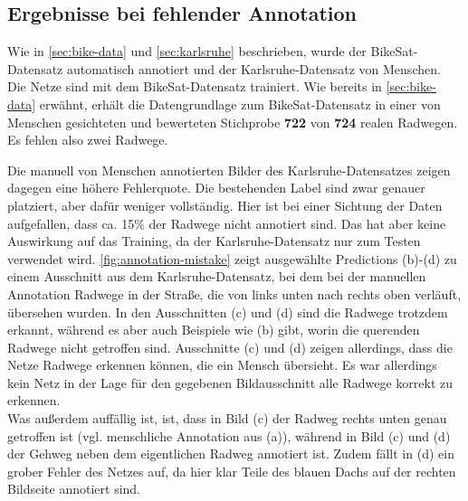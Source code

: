 \subsection{Ergebnisse bei fehlender Annotation}

Wie in \autoref{sec:bike-data} und \ref{sec:karlsruhe} beschrieben, wurde der BikeSat-Datensatz automatisch 
annotiert und der Karlsruhe-Datensatz von Menschen. Die Netze sind mit dem BikeSat-Datensatz trainiert. 
Wie bereits in \autoref{sec:bike-data} erwähnt, erhält die Datengrundlage zum BikeSat-Datensatz 
in einer von Menschen gesichteten und bewerteten Stichprobe \textbf{722} von \textbf{724} realen Radwegen.
Es fehlen also zwei Radwege. 

Die manuell von Menschen annotierten Bilder des Karlsruhe-Datensatzes zeigen dagegen eine höhere 
Fehlerquote. Die bestehenden Label sind zwar genauer platziert, aber dafür weniger vollständig. 
Hier ist bei einer Sichtung der Daten aufgefallen, dass ca. 15\% der Radwege nicht annotiert sind. 
Das hat aber keine Auswirkung auf das Training, da der Karlsruhe-Datensatz nur zum Testen verwendet wird.
\autoref{fig:annotation-mistake} zeigt ausgewählte Predictions (b)-(d) 
zu einem Ausschnitt aus dem Karlsruhe-Datensatz, bei dem bei der manuellen Annotation 
Radwege in der Straße, die von links unten nach rechts oben verläuft, übersehen wurden. 
In den Ausschnitten (c) und (d) sind die Radwege trotzdem erkannt, während es aber auch 
Beispiele wie (b) gibt, worin die querenden Radwege nicht getroffen sind. Ausschnitte (c) 
und (d) zeigen allerdings, dass die Netze Radwege erkennen können, die ein Mensch übersieht.
Es war allerdings kein Netz in der Lage für den gegebenen Bildausschnitt alle Radwege korrekt 
zu erkennen. \\
Was außerdem auffällig ist, ist, dass in Bild (c) der Radweg rechts unten genau getroffen ist 
(vgl. menschliche Annotation aus (a)), während in Bild (c) und (d) der Gehweg neben dem eigentlichen 
Radweg annotiert ist. Zudem fällt in (d) ein grober Fehler des Netzes auf, da hier klar Teile des 
blauen Dachs auf der rechten Bildseite annotiert sind.

